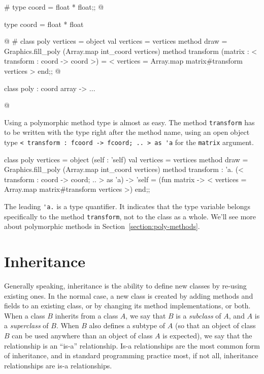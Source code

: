 \begin{ocaml}
# type coord = float * float;;
@
\begin{topoutput}
type coord = float * float
\end{topoutput}
@
# class poly vertices =
object
   val vertices = vertices
   method draw = Graphics.fill_poly (Array.map int_coord vertices)
   method transform (matrix : < transform : coord -> coord >) =
      {< vertices = Array.map matrix#transform vertices >}
end;;
@
\begin{topoutput}
class poly : coord array -> ...
\end{topoutput}
@
\end{ocaml}
%
Using a polymorphic method type is almost as easy.  The method \hbox{\lstinline/transform/} has to be
written with the type right after the method name, using an open object type
\hbox{\lstinline/< transform : fcoord -> fcoord; .. > as 'a/} for the \hbox{\lstinline/matrix/} argument.

\begin{ocaml}
class poly vertices =
object (self : 'self)
   val vertices = vertices
   method draw = Graphics.fill_poly (Array.map int_coord vertices)
   method transform : 'a. (< transform : coord -> coord; .. > as 'a) -> 'self =
      (fun matrix -> {< vertices = Array.map matrix#transform vertices >})
end;;
\end{ocaml}
%
The leading \hbox{\lstinline/'a./} is a type quantifier.  It indicates that the type variable belongs
specifically to the method \hbox{\lstinline/transform/}, not to the class as a whole.  We'll see more about
polymorphic methods in Section~\ref{section:poly-methods}.

\section{Inheritance}

Generally speaking, inheritance is the ability to define
new classes by re-using existing ones.  In the normal case, a new class is created by adding methods
and fields to an existing class, or by changing its method implementations, or both.  When a class
$B$ inherits from a class $A$, we say that $B$ is a \emph{subclass} of $A$, and $A$ is
a \emph{superclass} of $B$.  When $B$ also defines a subtype of $A$ (so that an object of class $B$
can be used anywhere than an object of class $A$ is expected), we say that the relationship is an
``is-a'' relationship.  Is-a relationships are the most common form of inheritance, and in standard
programming practice most, if not all, inheritance relationships are is-a relationships.

